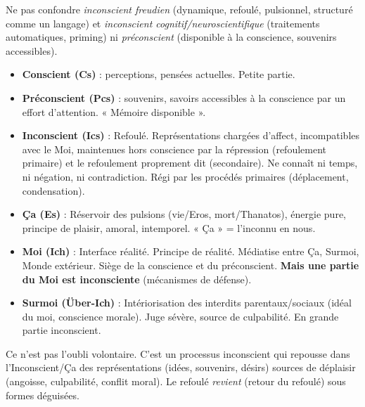 \documentclass[11pt]{article}
\newcommand{\cle}[1]{{\popxbold\color{popdark}#1}}
\newcounter{popsec}
\newcounter{popsub}
\newcommand{\courssub}[1]{%
  \stepcounter{popsub}%
  \par\vspace{9pt}\noindent{\popxbold\fontsize{11.5}{13}\selectfont\color{popink}{\color{poporange}\thepopsec.\thepopsub}\hspace{6pt}#1}\par\nopagebreak\vspace{4pt}
}
\begin{document}
\begin{attention}
Ne pas confondre \emph{inconscient freudien} (dynamique, refoulé, pulsionnel, structuré comme un langage) et \emph{inconscient cognitif/neuroscientifique} (traitements automatiques, priming) ni \emph{préconscient} (disponible à la conscience, souvenirs accessibles).
\end{attention}

\courssub{L'inconscient freudien}

\begin{definition}
\begin{itemize}
\item \textbf{Conscient (Cs)} : perceptions, pensées actuelles. Petite partie.
\item \textbf{Préconscient (Pcs)} : souvenirs, savoirs accessibles à la conscience par un effort d'attention. « Mémoire disponible ».
\item \textbf{Inconscient (Ics)} : \cle{Refoulé}. Représentations chargées d'affect, incompatibles avec le Moi, maintenues hors conscience par la \cle{répression} (refoulement primaire) et le \cle{refoulement proprement dit} (secondaire). Ne connaît ni temps, ni négation, ni contradiction. Régi par les \cle{procédés primaires} (déplacement, condensation).
\end{itemize}
\end{definition}

\begin{definition}
\begin{itemize}
\item \textbf{Ça (Es)} : Réservoir des pulsions (vie/Eros, mort/Thanatos), énergie pure, principe de plaisir, amoral, intemporel. « Ça » = l'inconnu en nous.
\item \textbf{Moi (Ich)} : Interface réalité. Principe de réalité. Médiatise entre Ça, Surmoi, Monde extérieur. Siège de la conscience et du préconscient. \textbf{Mais une partie du Moi est inconsciente} (mécanismes de défense).
\item \textbf{Surmoi (Über-Ich)} : Intériorisation des interdits parentaux/sociaux (idéal du moi, conscience morale). Juge sévère, source de culpabilité. En grande partie inconscient.
\end{itemize}
\end{definition}

\begin{aretenir}
Ce n'est pas l'oubli volontaire. C'est un \cle{processus inconscient} qui repousse dans l'Inconscient/Ça des représentations (idées, souvenirs, désirs) sources de déplaisir (angoisse, culpabilité, conflit moral). Le refoulé \emph{revient} (retour du refoulé) sous formes déguisées.
\end{aretenir}
\end{document}
